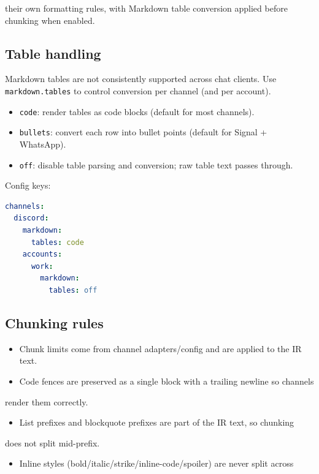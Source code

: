 their own formatting rules, with Markdown table conversion applied before
chunking when enabled.

\subsection{Table handling}


Markdown tables are not consistently supported across chat clients. Use
\texttt{markdown.tables} to control conversion per channel (and per account).

\begin{itemize}
  \item \texttt{code}: render tables as code blocks (default for most channels).
  \item \texttt{bullets}: convert each row into bullet points (default for Signal + WhatsApp).
  \item \texttt{off}: disable table parsing and conversion; raw table text passes through.
\end{itemize}


Config keys:

\begin{lstlisting}[language=yaml]
channels:
  discord:
    markdown:
      tables: code
    accounts:
      work:
        markdown:
          tables: off
\end{lstlisting}


\subsection{Chunking rules}


\begin{itemize}
  \item Chunk limits come from channel adapters/config and are applied to the IR text.
  \item Code fences are preserved as a single block with a trailing newline so channels
\end{itemize}

render them correctly.
\begin{itemize}
  \item List prefixes and blockquote prefixes are part of the IR text, so chunking
\end{itemize}

does not split mid-prefix.
\begin{itemize}
  \item Inline styles (bold/italic/strike/inline-code/spoiler) are never split across
\end{itemize}

